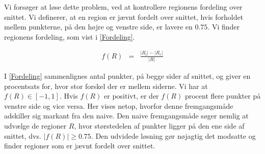{Vi forsøger at løse dette problem, ved at kontrollere regionens
fordeling over snittet. Vi definerer, at en region er jævnt fordelt over
snittet, hvis forholdet mellem punkterne, på den højre og venstre side,
er lavere en $0.75$. Vi finder regionens fordeling, som vist i
\eqref{Fordeling}.

\begin{eqnarray}
    f(R) & = & \frac{|R_{l}| - |R_{r}|}{|R|}
    \label{Fordeling}
\end{eqnarray}

I \eqref{Fordeling} sammenlignes antal punkter, på begge sider af
snittet, og giver en procentsats for, hvor stor forskel der er mellem
siderne. Vi har at $f(R) \in [-1,1]$.  Hvis $f(R)$ er positivt, er der
$f(R)$ procent flere punkter på venstre side og vice versa. Her vises
netop, hvorfor denne fremgangsmåde adskiller sig markant fra den naive.
Den naive fremgangsmåde søger nemlig at udvælge de regioner $R$, hvor
størstedelen af punkter ligger på den ene side af snittet, dvs. $|f(R)|
\geq 0.75$. Den udvidede løsning gør nøjagtig det modsatte og finder
regioner som er jævnt fordelt over snittet.

%

}

